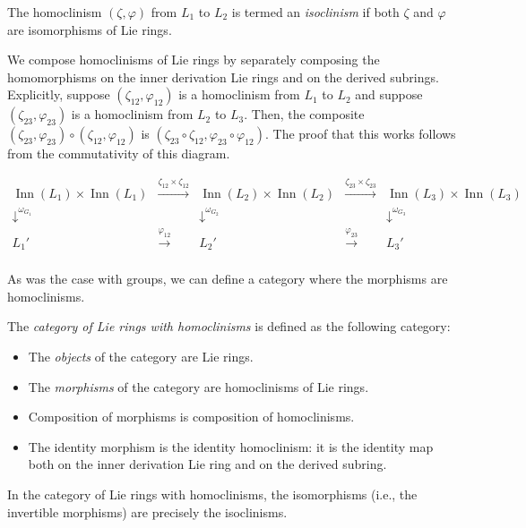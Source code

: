 \documentclass{ucetd}
\begin{document}
The homoclinism $(\zeta,\varphi)$ from $L_1$ to $L_2$ is termed an
{\em isoclinism} if both $\zeta$ and $\varphi$ are isomorphisms of Lie
rings.

We compose homoclinisms of Lie rings by separately composing the
homomorphisms on the inner derivation Lie rings and on the derived
subrings. Explicitly, suppose $(\zeta_{12},\varphi_{12})$ is a
homoclinism from $L_1$ to $L_2$ and suppose
$(\zeta_{23},\varphi_{23})$ is a homoclinism from $L_2$ to
$L_3$. Then, the composite $(\zeta_{23},\varphi_{23}) \circ
(\zeta_{12}, \varphi_{12})$ is $(\zeta_{23} \circ \zeta_{12},
\varphi_{23} \circ \varphi_{12})$. The proof that this works follows
from the commutativity of this diagram.

$$\begin{array}{ccccc}
  \operatorname{Inn}(L_1) \times \operatorname{Inn}(L_1) & \stackrel{\zeta_{12} \times \zeta_{12}}{\to} & \operatorname{Inn}(L_2) \times \operatorname{Inn}(L_2) & \stackrel{\zeta_{23} \times \zeta_{23}}{\to} & \operatorname{Inn}(L_3) \times \operatorname{Inn}(L_3)\\
  \downarrow^{\omega_{G_1}}  & & \downarrow^{\omega_{G_2}} & & \downarrow^{\omega_{G_3}}\\
  L_1' & \stackrel{\varphi_{12}}{\to} & L_2' & \stackrel{\varphi_{23}}{\to} & L_3'\\
\end{array}$$

As was the case with groups, we can define a category where the
morphisms are homoclinisms.

\begin{definer}
  The {\em category of Lie rings with homoclinisms} is defined as the
  following category:

  \begin{itemize}
  \item The {\em objects} of the category are Lie rings.
  \item The {\em morphisms} of the category are homoclinisms of Lie rings.
  \item Composition of morphisms is composition of homoclinisms.
  \item The identity morphism is the identity homoclinism: it is the
    identity map both on the inner derivation Lie ring and on the
    derived subring.
  \end{itemize}
\end{definer}

In the category of Lie rings with homoclinisms, the isomorphisms
(i.e., the invertible morphisms) are precisely the isoclinisms.
\end{document}
